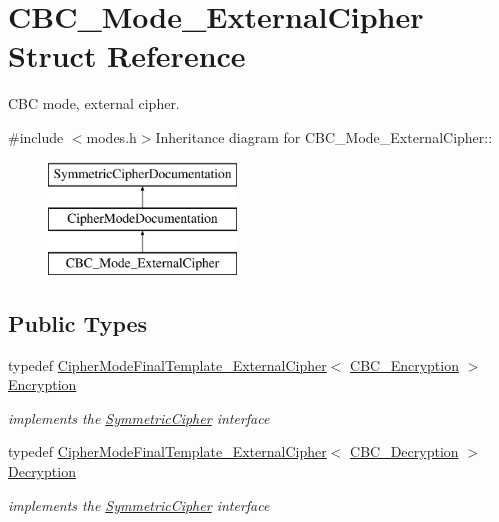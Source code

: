 \hypertarget{struct_c_b_c___mode___external_cipher}{
\section{CBC\_\-Mode\_\-ExternalCipher Struct Reference}
\label{struct_c_b_c___mode___external_cipher}
}


CBC mode, external cipher.  


{\ttfamily \#include $<$modes.h$>$}Inheritance diagram for CBC\_\-Mode\_\-ExternalCipher::\begin{figure}[H]
\begin{center}
\leavevmode
\includegraphics[height=3cm]{struct_c_b_c___mode___external_cipher}
\end{center}
\end{figure}
\subsection*{Public Types}
\begin{DoxyCompactItemize}
\item 
\hypertarget{struct_c_b_c___mode___external_cipher_aaa2800fcf5153e07c41c1916f3587e4a}{
typedef \hyperlink{class_cipher_mode_final_template___external_cipher}{CipherModeFinalTemplate\_\-ExternalCipher}$<$ \hyperlink{class_c_b_c___encryption}{CBC\_\-Encryption} $>$ \hyperlink{struct_c_b_c___mode___external_cipher_aaa2800fcf5153e07c41c1916f3587e4a}{Encryption}}
\label{struct_c_b_c___mode___external_cipher_aaa2800fcf5153e07c41c1916f3587e4a}

\begin{DoxyCompactList}\small\item\em implements the \hyperlink{class_symmetric_cipher}{SymmetricCipher} interface \item\end{DoxyCompactList}\item 
\hypertarget{struct_c_b_c___mode___external_cipher_a5ceba83614c424c79a13b64583627796}{
typedef \hyperlink{class_cipher_mode_final_template___external_cipher}{CipherModeFinalTemplate\_\-ExternalCipher}$<$ \hyperlink{class_c_b_c___decryption}{CBC\_\-Decryption} $>$ \hyperlink{struct_c_b_c___mode___external_cipher_a5ceba83614c424c79a13b64583627796}{Decryption}}
\label{struct_c_b_c___mode___external_cipher_a5ceba83614c424c79a13b64583627796}

\begin{DoxyCompactList}\small\item\em implements the \hyperlink{class_symmetric_cipher}{SymmetricCipher} interface \item\end{DoxyCompactList}\end{DoxyCompactItemize}


